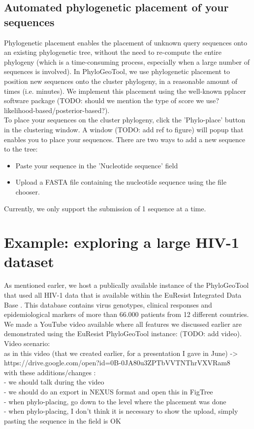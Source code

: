 \documentclass[a4paper, 11pt]{article} %
\begin{document}
\subsection{Automated phylogenetic placement of your sequences}
Phylogenetic placement enables the placement of unknown query sequences onto an existing phylogenetic tree, without the need to re-compute the entire phylogeny (which is a time-consuming process, especially when a large number of sequences is involved). In PhyloGeoTool, we use phylogenetic placement to position new sequences onto the cluster phylogeny, in a reasonable amount of times (i.e. minutes). We implement this placement using the well-known pplacer software package \cite{Matsen2010} (TODO: should we mention the type of score we use? likelihood-based/posterior-based?).\\
To place your sequences on the cluster phylogeny, click the 'Phylo-place' button in the clustering window. A window (TODO: add ref to figure) will popup that enables you to place your sequences. There are two ways to add a new sequence to the tree:
\begin{itemize}
\item Paste your sequence in the 'Nucleotide sequence' field
\item Upload a FASTA file containing the nucleotide sequence using the file chooser.
\end{itemize}
Currently, we only support the submission of 1 sequence at a time.

\section{Example: exploring a large HIV-1 dataset}

As mentioned earler, we host a publically available instance of the PhyloGeoTool that used all HIV-1 data that is available within the EuResist Integrated Data Base \cite{Zazzi2012}. 
This database contains virus genotypes, clinical responses and epidemiological markers of more than 66.000 patients from 12 different countries.
We made a YouTube video available where all features we discussed earlier are demonstrated using the EuResist PhyloGeoTool instance: (TODO: add video). \\

Video scenario:\\
 as in this video (that we created earlier, for a presentation I gave in June) -> https://drive.google.com/open?id=0B-0JA80u3ZPTbVVTNThrVXVRam8 \\
 with these additions/changes :\\  
 - we should talk during the video \\
 - we should do an export in NEXUS format and open this in FigTree \\
 - when phylo-placing, go down to the level where the placement was done\\
 - when phylo-placing, I don't think it is necessary to show the upload, simply pasting the sequence in the field is OK \\



\end{document}
